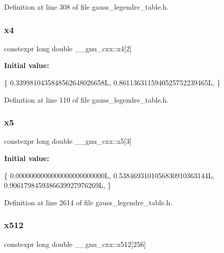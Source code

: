 Definition at line 308 of file gauss\+\_\+legendre\+\_\+table.\+h.

\mbox{\label{namespace____gnu__cxx_ab3836a2d30cb0608c5e0f7369fe64992}} 
\subsubsection{\texorpdfstring{x4}{x4}}
{\footnotesize\ttfamily constexpr long double \+\_\+\+\_\+gnu\+\_\+cxx\+::x4\mbox{[}2\mbox{]}}

{\bfseries Initial value\+:}
\begin{DoxyCode}
\{
    0.3399810435848562648026658L,
    0.8611363115940525752239465L,
  \}
\end{DoxyCode}


Definition at line 110 of file gauss\+\_\+legendre\+\_\+table.\+h.

\mbox{\label{namespace____gnu__cxx_acd6b6d22a84682bef2ab51e21dcf61d1}} 
\subsubsection{\texorpdfstring{x5}{x5}}
{\footnotesize\ttfamily constexpr long double \+\_\+\+\_\+gnu\+\_\+cxx\+::x5\mbox{[}3\mbox{]}}

{\bfseries Initial value\+:}
\begin{DoxyCode}
\{
    0.0000000000000000000000000L,
    0.5384693101056830910363144L,
    0.9061798459386639927976269L,
  \}
\end{DoxyCode}


Definition at line 2614 of file gauss\+\_\+legendre\+\_\+table.\+h.

\mbox{\label{namespace____gnu__cxx_af4191de87bfd6d41b9db60ee6af7d74b}} 
\subsubsection{\texorpdfstring{x512}{x512}}
{\footnotesize\ttfamily constexpr long double \+\_\+\+\_\+gnu\+\_\+cxx\+::x512\mbox{[}256\mbox{]}}



